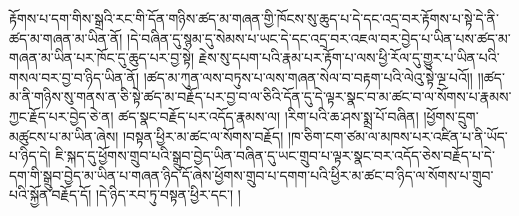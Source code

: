 རྟོགས་པ་དག་གིས་སྒྲའི་རང་གི་དོན་གཉིས་ཚད་མ་གཞན་གྱི་ཁོངས་སུ་ཆུད་པ་དེ་དང་འདྲ་བར་རྟོགས་པ་སྟེ་དེ་ནི་ཚད་མ་གཞན་མ་ཡིན་ནོ། །དེ་བཞིན་དུ་སྙམ་དུ་སེམས་པ་ཡང་དེ་དང་འདྲ་བར་འཇལ་བར་བྱེད་པ་ཡིན་པས་ཚད་མ་གཞན་མ་ཡིན་པར་ཁོང་དུ་ཆུད་པར་བྱ་སྟེ། རྗེས་སུ་དཔག་པའི་རྣམ་པར་རྟོག་པ་ལས་ཕྱི་རོལ་དུ་གྱུར་པ་ཡིན་པའི་གསལ་བར་བྱ་བ་ཉིད་ཡིན་ནོ། །ཚད་མ་ཀུན་ལས་བཏུས་པ་ལས་གཞན་སེལ་བ་བརྟག་པའི་ལེའུ་སྟེ་ལྔ་པའོ།། །།ཚད་མ་ནི་གཉིས་སུ་གནས་ན་ཅི་སྟེ་ཚད་མ་བརྗོད་པར་བྱ་བ་ལ་ཅིའི་དོན་དུ་དེ་ལྟར་སྣང་བ་མ་ཚང་བ་ལ་སོགས་པ་རྣམས་ཀྱང་རྗོད་པར་བྱེད་ཅེ་ན། ཚད་སྣང་བརྗོད་པར་འདོད་རྣམས་ལ། །རིག་པའི་ཆ་ཤས་སྨྲ་པོ་བཞིན། །ཕྱོགས་དྲུག་མཚུངས་པ་མ་ཡིན་ཞེས། །བསྟན་ཕྱིར་མ་ཚང་ལ་སོགས་བརྗོད། །ཁ་ཅིག་ངག་ཙམ་ལ་མཁས་པར་འཛིན་པ་ནི་ཡོད་པ་ཉིད་དེ། ཇི་སྐད་དུ་ཕྱོགས་གྲུབ་པའི་སྒྲུབ་བྱེད་ཡིན་བཞིན་དུ་ཡང་གྲུབ་པ་ལྟར་སྣང་བར་འདོད་ཅེས་བརྗོད་པ་དེ་དག་གི་སྒྲུབ་བྱེད་མ་ཡིན་པ་གཞན་ཉིད་དོ་ཞེས་ཕྱོགས་གྲུབ་པ་དགག་པའི་ཕྱིར་མ་ཚང་བ་ཉིད་ལ་སོགས་པ་གྲུབ་པའི་སྐྱོན་བརྗོད་དོ། །དེ་ཉིད་རབ་ཏུ་བསྟན་ཕྱིར་དང་། །
